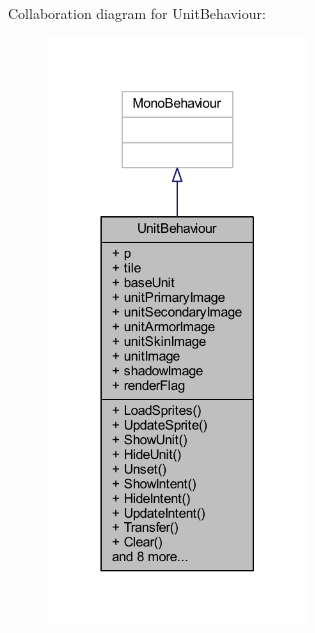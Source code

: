 Collaboration diagram for Unit\+Behaviour\+:
\nopagebreak
\begin{figure}[H]
\begin{center}
\leavevmode
\includegraphics[width=194pt]{class_unit_behaviour__coll__graph}
\end{center}
\end{figure}
